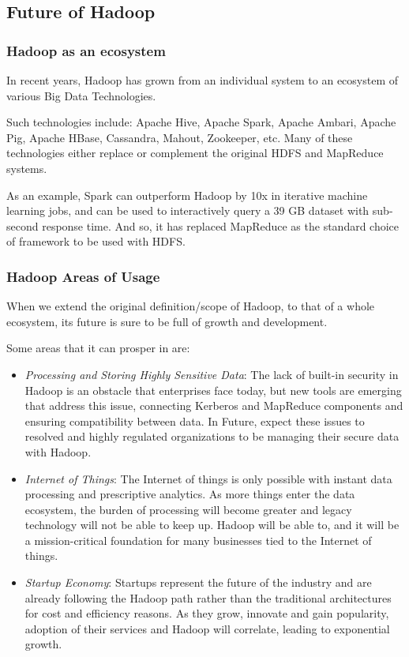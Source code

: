 \documentclass[a4paper,12pt,oneside]{report}
\begin{document}
\subsection{Future of Hadoop}

\subsubsection{Hadoop as an ecosystem}

In recent years, Hadoop has grown from an individual system to an ecosystem of 
various Big Data Technologies.

Such technologies include: Apache Hive, Apache Spark, Apache Ambari, Apache Pig,
Apache HBase, Cassandra, Mahout, Zookeeper, etc. Many of these technologies either 
replace or complement the original HDFS and MapReduce systems.

As an example, Spark can outperform Hadoop by 10x in iterative machine learning jobs, 
and can be used to interactively query a 39 GB dataset with sub-second response time.\cite{Zaharia2010}
And so, it has replaced MapReduce as the standard choice of framework to be used with HDFS. 

\subsubsection{Hadoop Areas of Usage}

When we extend the original definition/scope of Hadoop, to that of a whole ecosystem, its
future is sure to be full of growth and development.

Some areas that it can prosper in are:

\begin{itemize}
    \item \textit{Processing and Storing Highly Sensitive Data}:
The lack of built-in security in Hadoop is an obstacle that enterprises face 
today, but new tools are emerging that address this issue, connecting Kerberos 
and MapReduce components and ensuring compatibility between data. In Future, 
expect these issues to resolved and highly regulated organizations to be managing their secure data with Hadoop.

    \item \textit{Internet of Things}:
The Internet of things is only possible with instant data processing and prescriptive analytics. 
As more things enter the data ecosystem, the burden of processing will become greater and legacy technology will 
not be able to keep up. Hadoop will be able to, and it will be a mission-critical foundation for many businesses 
tied to the Internet of things.

    \item \textit{Startup Economy}:
Startups represent the future of the industry and are already following the Hadoop path rather than the 
traditional architectures for cost and efficiency reasons. As they grow, innovate and gain popularity, 
adoption of their services and Hadoop will correlate, leading to exponential growth.
\end{itemize}
\end{document}
